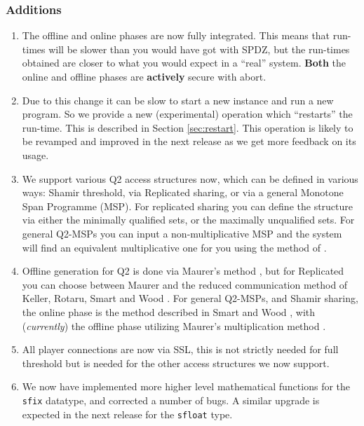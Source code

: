 \subsubsection{Additions}
\begin{enumerate}
\item The offline and online phases are now fully integrated.
This means that run-times will be slower than you would have got
with SPDZ, but the run-times obtained are closer to what you would
expect in a ``real'' system.
{\bf Both} the online and offline phases are {\bf actively} secure
with abort.
\item Due to this change it can be slow to start a new instance
and run a new program. So we provide a new (experimental) operation which 
``restarts'' the run-time. This is described in Section \ref{sec:restart}.
This operation is likely to be revamped and improved in the next
release as we get more feedback on its usage.
\item We support various Q2 access structures now, which can be
defined in various ways: Shamir threshold, via Replicated sharing,
or via a general Monotone Span Programme (MSP).
For replicated sharing you can define the structure
via either the minimally qualified sets, or the maximally unqualified
sets.
For general Q2-MSPs you can input a non-multiplicative MSP and the
system will find an equivalent multiplicative one for you using the
method of \cite{CDM00}.
\item Offline generation for Q2 is done via Maurer's method \cite{Maurer}, but
for Replicated you can choose between Maurer and the reduced communication
method of Keller, Rotaru, Smart and Wood \cite{KRSW}.
For general Q2-MSPs, and Shamir sharing, the online phase is the method described in Smart and Wood \cite{SW18},
with ({\em currently}) the offline phase utilizing Maurer's multiplication method \cite{Maurer}.
\item All player connections are now via SSL, this is not strictly
needed for full threshold but is needed for the other access structures
we now support.
\item We now have implemented more higher level mathematical functions for
the \verb+sfix+ datatype, and corrected a number of bugs. 
A similar upgrade is expected in the next release for the \verb+sfloat+ type.
\end{enumerate}

